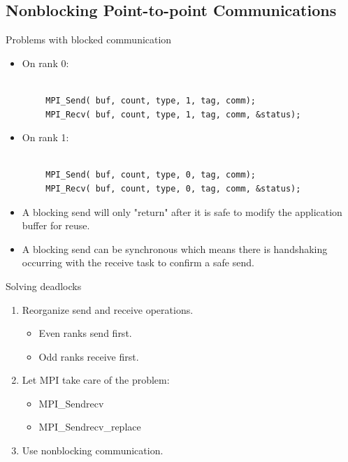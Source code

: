 \subsection{Nonblocking Point-to-point Communications}
\begin{frame}[fragile]{Problems with blocked communication}
 \vspace{3mm}
\begin{itemize}
\item On rank 0:
\end{itemize}
\small\begin{verbatim}

        MPI_Send( buf, count, type, 1, tag, comm);
        MPI_Recv( buf, count, type, 1, tag, comm, &status);

\end{verbatim}
\normalsize

\begin{itemize}
\item On rank 1: 
\end{itemize}
\small\begin{verbatim}

        MPI_Send( buf, count, type, 0, tag, comm);
        MPI_Recv( buf, count, type, 0, tag, comm, &status);

\end{verbatim}
\normalsize
\vspace{-2mm}
\begin{itemize}
\item A blocking send will only "return" after it is safe to modify the application buffer for reuse.
\item A blocking send can be synchronous which means there is handshaking occurring with the receive task to confirm a safe send. 
\end{itemize}

\end{frame}

\begin{frame}[fragile]{Solving deadlocks}
 \vspace{3mm}
\begin{enumerate}
\item Reorganize send and receive operations.
    \begin{itemize}
    \item Even ranks send first.
    \item Odd ranks receive first. 
    \end{itemize}
     \vspace{3mm}
\item Let MPI take care of the problem:
    \begin{itemize}
    \item MPI\_Sendrecv
    \item MPI\_Sendrecv\_replace
    \end{itemize}
     \vspace{3mm}
\item Use nonblocking communication. 
\end{enumerate}



\end{frame}

